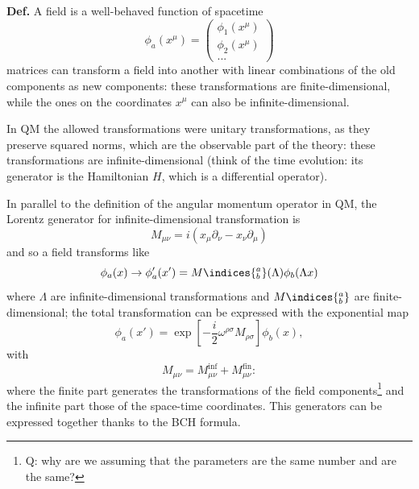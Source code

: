 \textbf{Def.} A field is a well-behaved function of spacetime
$$\phi_a(x^\mu) = \begin{pmatrix}
    \phi_1(x^\mu)\\
    \phi_2(x^\mu)\\
    ...
\end{pmatrix}
$$
matrices can transform a field into another with linear combinations of the old
components as new components: these transformations are finite-dimensional, while
the ones on the coordinates $x^\mu$ can also be infinite-dimensional.

In QM the allowed transformations were unitary transformations, as they preserve
squared norms, which are the observable part of the theory: these transformations
are infinite-dimensional (think of the time evolution: its generator is the
Hamiltonian $H$, which is a differential operator).

In parallel to the definition of the angular momentum operator in QM, the Lorentz
generator for infinite-dimensional transformation is
$$M_{\mu\nu} = i (x_\mu\partial_\nu-x_\nu\partial_\mu)$$
and so a field transforms like
$$\phi_a(x) \rightarrow \phi_a'(x') = M\indices{^a_b}(\Lambda)\phi_b(\Lambda x)$$
where $\Lambda$ are infinite-dimensional transformations and $M\indices{^a_b}$ are
finite-dimensional;
the total transformation can be expressed with the exponential map
$$\phi_a(x')=\exp\left[-\frac{i}{2}\omega^{\rho\sigma}M_{\rho\sigma}\right]\phi_b(x),
$$
with
$$M_{\mu\nu} = M_{\mu\nu}^\text{inf} + M_{\mu\nu}^\text{fin}:$$
where the finite part generates the transformations of the field components\footnote{
Q: why are we assuming that the parameters are the same number and are the same?}
and the infinite part those of the space-time coordinates. This generators can be
expressed together thanks to the BCH formula.
